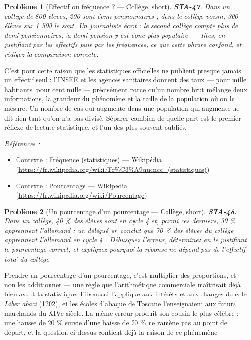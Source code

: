 \documentclass[11pt]{article}
\newtheorem{problem}{Problème}
\newenvironment{refs}{\par\small\noindent\emph{Références :}\begin{itemize}\setlength\itemsep{0pt}}{\end{itemize}\normalsize}
\begin{document}
\bigskip

\begin{problem}[{Effectif ou fréquence ? --- Collège, short}]
\textbf{STA-47.} Dans un collège de 800 élèves, 200 sont demi-pensionnaires ;
dans le collège voisin, 300 élèves sur 1 500 le sont. Un journaliste écrit : \og{} le second collège
compte plus de demi-pensionnaires, la demi-pension y est donc plus populaire \fg{} --- dites, en
justifiant par les effectifs puis par les fréquences, ce que cette phrase confond, et rédigez la
comparaison correcte.
\end{problem}

\noindent C'est pour cette raison que les statistiques officielles ne publient presque
jamais un effectif seul : l'INSEE et les agences sanitaires donnent des taux --- pour mille
habitants, pour cent mille --- précisément parce qu'un nombre brut mélange deux informations, la
grandeur du phénomène et la taille de la population où on le mesure. Un nombre de cas qui augmente
dans une population qui augmente ne dit rien tant qu'on n'a pas divisé. Séparer \og{} combien \fg{} de
\og{} quelle part \fg{} est le premier réflexe de lecture statistique, et l'un des plus souvent oubliés.

\begin{refs}
\item Contexte : Fréquence (statistiques) --- Wikipédia (\url{https://fr.wikipedia.org/wiki/Fr%C3%A9quence_(statistiques)})
\item Contexte : Pourcentage --- Wikipédia (\url{https://fr.wikipedia.org/wiki/Pourcentage})
\end{refs}

\bigskip

\begin{problem}[{Un pourcentage d'un pourcentage --- Collège, short}]
\textbf{STA-48.} Dans un collège, 40 \% des élèves sont en cycle 4 et, parmi
ces derniers, 30 \% apprennent l'allemand ; un délégué en conclut que \og{} 70 \% des élèves du collège
apprennent l'allemand en cycle 4 \fg{}. Débusquez l'erreur, déterminez en le justifiant le pourcentage
correct, et expliquez pourquoi la réponse ne dépend pas de l'effectif total du collège.
\end{problem}

\noindent Prendre un pourcentage d'un pourcentage, c'est multiplier des proportions, et
non les additionner --- une règle que l'arithmétique commerciale maîtrisait déjà bien avant la
statistique. Fibonacci l'applique aux intérêts et aux changes dans le \textit{Liber abaci} (1202), et
les écoles d'abaque de Toscane l'enseignaient aux futurs marchands du XIVe siècle. La
même erreur produit son cousin le plus célèbre : une hausse de 20 \% suivie d'une baisse de 20 \% ne
ramène pas au point de départ, et la question ci-dessus contient déjà la raison de ce
phénomène.
\end{document}
